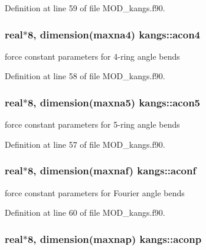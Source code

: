 Definition at line 59 of file M\-O\-D\-\_\-kangs.\-f90.

\hypertarget{classkangs_a4ec467bca16ca8dfc4257b00c1b5960e}{
\subsubsection[{acon4}]{\setlength{\rightskip}{0pt plus 5cm}real$\ast$8, dimension({\bf maxna4}) kangs\-::acon4}}\label{classkangs_a4ec467bca16ca8dfc4257b00c1b5960e}


force constant parameters for 4-\/ring angle bends 



Definition at line 58 of file M\-O\-D\-\_\-kangs.\-f90.

\hypertarget{classkangs_a0d230fc1b45ed6bd51f256e0eb019288}{
\subsubsection[{acon5}]{\setlength{\rightskip}{0pt plus 5cm}real$\ast$8, dimension({\bf maxna5}) kangs\-::acon5}}\label{classkangs_a0d230fc1b45ed6bd51f256e0eb019288}


force constant parameters for 5-\/ring angle bends 



Definition at line 57 of file M\-O\-D\-\_\-kangs.\-f90.

\hypertarget{classkangs_a70fc76818cea5d69e8cab06e440f79ca}{
\subsubsection[{aconf}]{\setlength{\rightskip}{0pt plus 5cm}real$\ast$8, dimension({\bf maxnaf}) kangs\-::aconf}}\label{classkangs_a70fc76818cea5d69e8cab06e440f79ca}


force constant parameters for Fourier angle bends 



Definition at line 60 of file M\-O\-D\-\_\-kangs.\-f90.

\hypertarget{classkangs_ad4cfec56d1a070afa1a9e0dc8d2bea9a}{
\subsubsection[{aconp}]{\setlength{\rightskip}{0pt plus 5cm}real$\ast$8, dimension({\bf maxnap}) kangs\-::aconp}}\label{classkangs_ad4cfec56d1a070afa1a9e0dc8d2bea9a}


